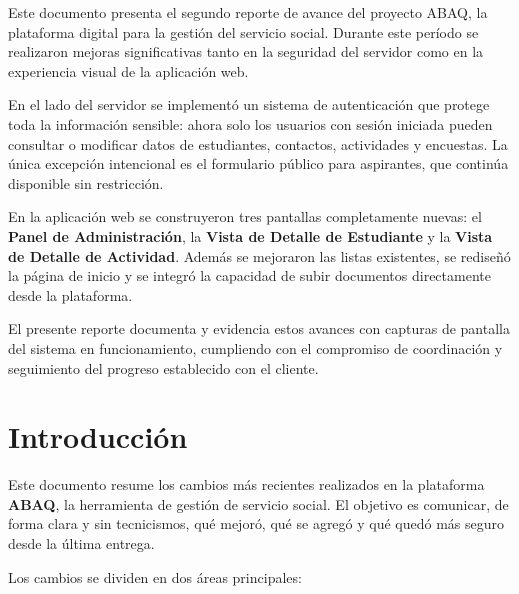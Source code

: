 \documentclass[12pt, a4paper]{article}
\begin{document}
\begin{onehalfspace}
Este documento presenta el segundo reporte de avance del proyecto ABAQ, la plataforma digital para la gestión del servicio social. Durante este período se realizaron mejoras significativas tanto en la seguridad del servidor como en la experiencia visual de la aplicación web.

En el lado del servidor se implementó un sistema de autenticación que protege toda la información sensible: ahora solo los usuarios con sesión iniciada pueden consultar o modificar datos de estudiantes, contactos, actividades y encuestas. La única excepción intencional es el formulario público para aspirantes, que continúa disponible sin restricción.

En la aplicación web se construyeron tres pantallas completamente nuevas: el \textbf{Panel de Administración}, la \textbf{Vista de Detalle de Estudiante} y la \textbf{Vista de Detalle de Actividad}. Además se mejoraron las listas existentes, se rediseñó la página de inicio y se integró la capacidad de subir documentos directamente desde la plataforma.

El presente reporte documenta y evidencia estos avances con capturas de pantalla del sistema en funcionamiento, cumpliendo con el compromiso de coordinación y seguimiento del progreso establecido con el cliente.
\end{onehalfspace}

\newpage
\tableofcontents

\newpage
\listoffigures

\newpage
\listoftables

\newpage
\section{Introducción}

Este documento resume los cambios más recientes realizados en la plataforma \textbf{ABAQ}, la herramienta de gestión de servicio social. El objetivo es comunicar, de forma clara y sin tecnicismos, qué mejoró, qué se agregó y qué quedó más seguro desde la última entrega.

Los cambios se dividen en dos áreas principales:
\end{document}
